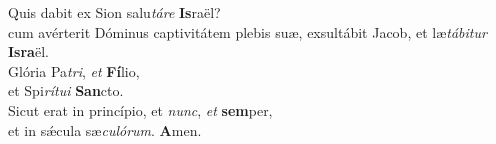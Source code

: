 \oddverse Quis dabit ex Sion salu\textit{tá}\textit{re} \textbf{Is}raël?~\*\\
\oddverse cum avérterit Dóminus captivitátem plebis suæ, exsultábit Jacob, et læ\textit{tá}\textit{bi}\textit{tur} \textbf{Is}\textbf{ra}ël.\\
\evenverse Glória Pa\textit{tri}, \textit{et} \textbf{Fí}lio,~\*\\
\evenverse et Spi\textit{rí}\textit{tu}\textit{i} \textbf{San}cto.\\
\oddverse Sicut erat in princípio, et \textit{nunc}, \textit{et} \textbf{sem}per,~\*\\
\oddverse et in sǽcula sæ\textit{cu}\textit{ló}\textit{rum}. \textbf{A}men.\\
